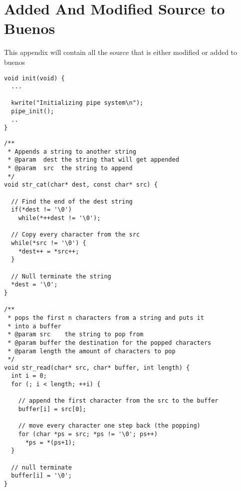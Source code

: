 \documentclass[12pt]{article}
\begin{document}
\newpage

\section{Added And Modified Source to Buenos}

This appendix will contain all the source that is either modified or added to buenos

\begin{lstlisting}[caption=main.c]
void init(void) {
  ...

  kwrite("Initializing pipe system\n");
  pipe_init();
  ..
}
\end{lstlisting}

\begin{lstlisting}[caption=libc.c]
/**
 * Appends a string to another string
 * @param  dest the string that will get appended
 * @param  src  the string to append
 */
void str_cat(char* dest, const char* src) {

  // Find the end of the dest string
  if(*dest != '\0')
    while(*++dest != '\0');

  // Copy every character from the src
  while(*src != '\0') {
    *dest++ = *src++;
  }

  // Null terminate the string
  *dest = '\0';
}

/**
 * pops the first n characters from a string and puts it 
 * into a buffer
 * @param src    the string to pop from
 * @param buffer the destination for the popped characters
 * @param length the amount of characters to pop
 */
void str_read(char* src, char* buffer, int length) {
  int i = 0;
  for (; i < length; ++i) {

    // append the first character from the src to the buffer
    buffer[i] = src[0];

    // move every character one step back (the popping)
    for (char *ps = src; *ps != '\0'; ps++)
      *ps = *(ps+1);
  }

  // null terminate
  buffer[i] = '\0';
}
\end{lstlisting}
\end{document}
